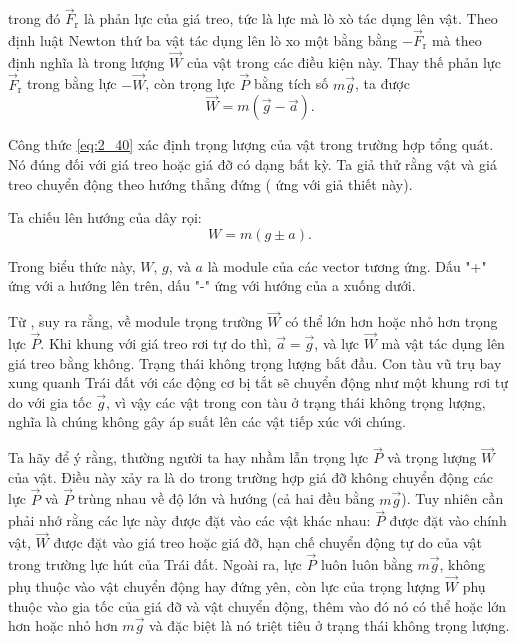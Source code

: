 \noindent
trong đó $\vec{F}_{\text{r}}$ là phản lực của giá treo, tức là lực mà lò xò tác dụng lên vật. Theo định luật Newton thứ ba vật tác dụng lên lò xo một bằng bằng $-\vec{F}_{\text{r}}$ mà theo định nghĩa là trong lượng $\vec{W}$ của vật trong các điều kiện này. Thay thế phản lực $\vec{F}_{\text{r}}$ trong  bằng lực $-\vec{W}$, còn trọng lực $\vec{P}$ bằng tích số $m\vec{g}$, ta được
\begin{equation}\label{eq:2_40}
\vec{W} = m(\vec{g} - \vec{a}).
\end{equation}

\noindent
Công thức \eqref{eq:2_40} xác định trọng lượng của vật trong trường hợp tổng quát. Nó đúng đối với giá treo hoặc giá đỡ có dạng bất kỳ.
Ta giả thử rằng vật và giá treo chuyển động theo hướng thẳng đứng ( ứng với giả thiết này).

Ta chiếu  lên hướng của dây rọi:
\begin{equation}\label{eq:2_41}
W = m(g \pm a).
\end{equation}

\noindent
Trong biểu thức này, $W$, $g$, và $a$ là module của các vector tương ứng. Dấu "+" ứng với a hướng lên trên, dấu "-" ứng với hướng của a xuống dưới.

Từ , suy ra rằng, về module trọng trường $\vec{W}$ có thể lớn hơn hoặc nhỏ hơn trọng lực $\vec{P}$. Khi khung với giá treo rơi tự do thì, $\vec{a}=\vec{g}$, và lực $\vec{W}$ mà vật tác dụng lên giá treo bằng không. Trạng thái không trọng lượng bắt đầu. Con tàu vũ trụ bay xung quanh Trái đất với các động cơ bị tắt sẽ chuyển động như một khung rơi tự do với gia tốc $\vec{g}$, vì vậy các vật trong con tàu ở trạng thái không trọng lượng, nghĩa là chúng không gây áp suất lên các vật tiếp xúc với chúng.

Ta hãy để ý rằng, thường người ta hay nhầm lẫn trọng lực $\vec{P}$ và trọng lượng $\vec{W}$ của vật. Điều này xảy ra là do trong trường hợp giá đỡ không chuyển động các lực $\vec{P}$ và $\vec{P}$ trùng nhau về độ lớn và hướng (cả hai đều bằng $m\vec{g}$). Tuy nhiên cần phải nhớ rằng các lực này được đặt vào các vật khác nhau: $\vec{P}$ được đặt vào chính vật, $\vec{W}$ được đặt vào giá treo hoặc giá đỡ, hạn chế chuyển động tự do của vật trong trường lực hút của Trái đất. Ngoài ra, lực $\vec{P}$ luôn luôn bằng $m\vec{g}$, không phụ thuộc vào vật chuyển động hay đứng yên, còn lực của trọng lượng $\vec{W}$ phụ thuộc vào gia tốc của giá đỡ và vật chuyển động, thêm vào đó nó có thể hoặc lớn hơn hoặc nhỏ hơn $m\vec{g}$ và đặc biệt là nó triệt tiêu ở trạng thái không trọng lượng.

